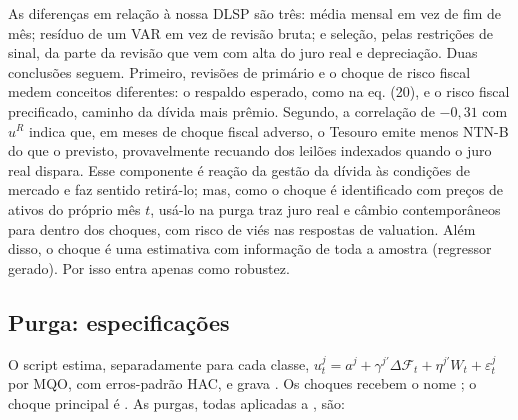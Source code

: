 \documentclass[12pt,a4paper]{article}
\begin{document}
As diferenças em relação à nossa DLSP são três: média mensal em vez de fim de mês;
resíduo de um VAR em vez de revisão bruta; e seleção, pelas restrições de sinal, da
parte da revisão que vem com alta do juro real e depreciação. Duas conclusões seguem.
Primeiro, revisões de primário e o choque de risco fiscal medem conceitos diferentes:
o respaldo esperado, como na eq. (20), e o risco fiscal precificado, caminho da dívida
mais prêmio. Segundo, a correlação de \(-0{,}31\) com \(u^R\) indica que, em meses de
choque fiscal adverso, o Tesouro emite menos NTN-B do que o previsto, provavelmente
recuando dos leilões indexados quando o juro real dispara. Esse componente é reação
da gestão da dívida às condições de mercado e faz sentido retirá-lo; mas, como o
choque é identificado com preços de ativos do próprio mês \(t\), usá-lo na purga traz
juro real e câmbio contemporâneos para dentro dos choques, com risco de viés nas
respostas de valuation. Além disso, o choque é uma estimativa com informação de toda a
amostra (regressor gerado). Por isso entra apenas como robustez.

\subsection{Purga: especificações}

O script  estima, separadamente para cada classe,
\(u_t^j=a^j+\gamma^{j\prime}\Delta\mathcal{F}_t+\eta^{j\prime}W_t+\varepsilon_t^j\)
por MQO, com erros-padrão HAC, e grava
. Os choques recebem o nome ; o
choque principal é . As purgas, todas aplicadas a
, são:
\end{document}
